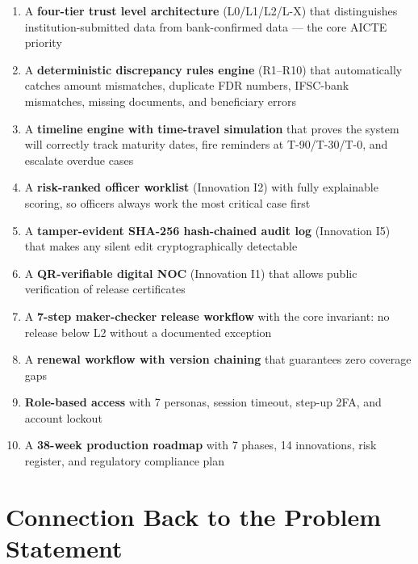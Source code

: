 \documentclass[12pt, a4paper]{report}
\begin{document}
\begin{enumerate}
  \item A \textbf{four-tier trust level architecture} (L0/L1/L2/L-X) that distinguishes institution-submitted data from bank-confirmed data --- the core AICTE priority
  
  \item A \textbf{deterministic discrepancy rules engine} (R1--R10) that automatically catches amount mismatches, duplicate FDR numbers, IFSC-bank mismatches, missing documents, and beneficiary errors
  
  \item A \textbf{timeline engine with time-travel simulation} that proves the system will correctly track maturity dates, fire reminders at T-90/T-30/T-0, and escalate overdue cases
  
  \item A \textbf{risk-ranked officer worklist} (Innovation I2) with fully explainable scoring, so officers always work the most critical case first
  
  \item A \textbf{tamper-evident SHA-256 hash-chained audit log} (Innovation I5) that makes any silent edit cryptographically detectable
  
  \item A \textbf{QR-verifiable digital NOC} (Innovation I1) that allows public verification of release certificates
  
  \item A \textbf{7-step maker-checker release workflow} with the core invariant: no release below L2 without a documented exception
  
  \item A \textbf{renewal workflow with version chaining} that guarantees zero coverage gaps
  
  \item \textbf{Role-based access} with 7 personas, session timeout, step-up 2FA, and account lockout
  
  \item A \textbf{38-week production roadmap} with 7 phases, 14 innovations, risk register, and regulatory compliance plan
\end{enumerate}

\section{Connection Back to the Problem Statement}
\end{document}
